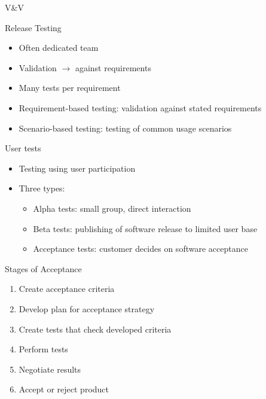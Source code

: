 \begin{frame}{\insertsubsection}
	\begin{fancycolumns}[animation=none]
		\begin{note}{V\&V \mysource{\seeconomics}}
		\end{note}	\pause
		\begin{definition}{Release Testing}
			\begin{itemize}
				\item Often dedicated team
				\item Validation $\rightarrow$ against requirements
				\item Many tests per requirement
				\item Requirement-based testing: validation against stated requirements
				\item Scenario-based testing: testing of common usage scenarios
			\end{itemize}
		\end{definition}\pause
		\nextcolumn
		\begin{definition}{User tests}
			\begin{itemize}
				\item Testing using user participation
				\item Three types:
				\begin{itemize}
					\item Alpha tests: small group, direct interaction
					\item Beta tests: publishing of software release to limited user base
					\item Acceptance tests: customer decides on software acceptance
				\end{itemize}
			\end{itemize} 
		\end{definition} \pause
		\begin{note}{Stages of Acceptance \mysource{\sommerville}}
			\begin{enumerate}
				\item Create acceptance criteria
				\item Develop plan for acceptance strategy
				\item Create tests that check developed criteria
				\item Perform tests
				\item Negotiate results
				\item Accept or reject product
			\end{enumerate}
		\end{note}
		
	\end{fancycolumns}
\end{frame}

